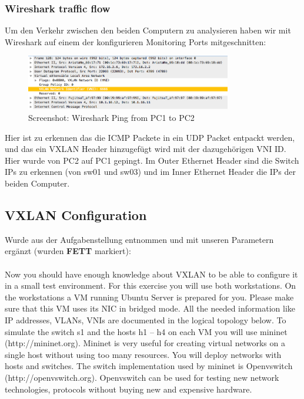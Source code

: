 \documentclass[a4,12pt]{scrartcl}
\begin{document}
\subsubsection{Wireshark traffic flow}
Um den Verkehr zwischen den beiden Computern zu analysieren haben wir mit Wireshark auf einem der konfigurieren Monitoring Ports mitgeschnitten: 
\begin{figure} [H]
	\begin{center}
	\includegraphics[width=0.80\textwidth]{./pictures/vxlan_ex3_sniff.png}
	\caption{Screenshot: Wireshark Ping from PC1 to PC2}
	\label{x}
	\end{center}
\end{figure}
\noindent Hier ist zu erkennen das die ICMP Packete in ein UDP Packet entpackt werden, und das ein VXLAN Header hinzugefügt wird mit der dazugehörigen VNI ID. Hier wurde von PC2 auf PC1 gepingt. Im Outer Ethernet Header sind die Switch IPs zu erkennen (von sw01 und sw03) und im Inner Ethernet Header die IPs der beiden Computer. 

\subsection{VXLAN Configuration}
Wurde aus der Aufgabenstellung entnommen und mit unseren Parametern ergänzt (wurden \textbf{FETT} markiert): \\
\\
Now you should have enough knowledge about VXLAN to be able to configure it in a small test environment. For this exercise you will use both workstations. On the workstations a VM running Ubuntu Server is prepared for you. Please make sure that this VM uses its NIC in bridged mode. All the needed information like IP addresses, VLANs, VNIs are documented in the logical topology below.
To simulate the switch s1 and the hosts h1 – h4 on each VM you will use mininet (http://mininet.org).
Mininet is very useful for creating virtual networks on a single host without using too many resources. You will deploy networks with hosts and switches. The switch implementation used by mininet is Openvswitch (http://openvswitch.org). Openvswitch can be used for testing new network technologies, protocols without buying new and expensive hardware.
\end{document}
